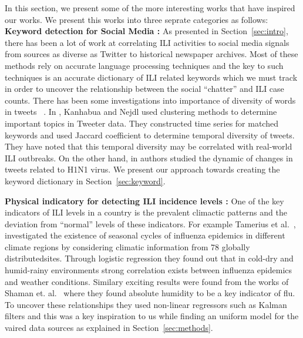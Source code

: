 In this section, we present some of the more interesting works that have
inspired our works. We present this works into three seprate categories as follows: \\

\textbf{Keyword detection for Social Media :} 
As presented in Section~\ref{sec:intro}, there has been a lot of 
work at correlating ILI activities to social media signals from sources as diverse 
as Twitter to historical newspaper archives. Most of these methods rely on 
accurate language processing techniques and the key to such techniques is an 
accurate dictionary of ILI related keywords which we must track in order to 
uncover the relationship between the social ``chatter'' and ILI case counts. 
There has been some investigations into importance of diversity of words
in tweets ~\cite{ref5, 6}. In
\cite{ref5}, Kanhabua and Nejdl used clustering methods to determine
important topics in Tweeter data. They constructed time series for
matched keywords and used Jaccard coefficient to determine temporal
diversity of tweets. They have noted that this temporal diversity may be
correlated with real-world ILI outbreaks. On the other hand, in \cite{ref6}
authors studied the dynamic of changes in tweets related to H1N1 virus. We 
present our approach towards creating the keyword dictionary in Section~\ref{sec:keyword}.

\textbf{ Physical indicatory for detecting ILI incidence levels :} 
One of the key indicators of ILI levels in a country is the prevalent 
climactic patterns and the deviation from ``normal'' levels of these 
indicators. For example Tamerius et al.~\cite{ref9}, investigated the existence of seasonal 
cycles of influenza epidemics in different climate regions
by considering
climatic information from 78 globally distributedsites. Through logistic
regression they found out that in cold-dry and humid-rainy
environments strong correlation exists between influenza epidemics and
weather conditions. Similary exciting results were found from the works
of Shaman et. al.~\cite{Shaman_orig_humidity_link, Shaman_humidity_USA}
where they found absolute humidity to be a key indicator of flu. To uncover 
these relationships they used non-linear regressors such as Kalman filters 
and this was a key inspiration to us while finding an uniform model for the
vaired data sources as explained in Section~\ref{sec:methods}.


